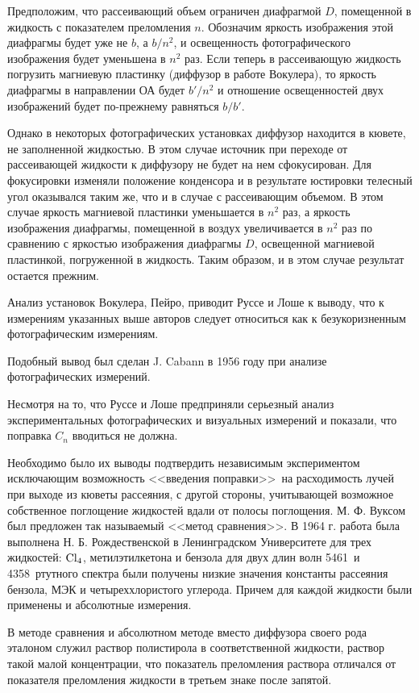 Предположим, что рассеивающий объем ограничен диафрагмой $D$, помещенной в жидкость с показателем преломления $n$. Обозначим яркость изображения этой диафрагмы будет уже не $b$, а $b/n^2$, и освещенность фотографического изображения будет уменьшена в $n^2$ раз. Если теперь в рассеивающую жидкость погрузить магниевую пластинку (диффузор в работе Вокулера), то яркость диафрагмы в направлении ОА будет $b'/n^2$ и отношение освещенностей двух изображений будет по-прежнему равняться $b/b'$.

Однако в некоторых фотографических установках диффузор находится в кювете, не заполненной жидкостью. В этом случае источник при переходе от рассеивающей жидкости к диффузору не будет на нем сфокусирован. Для фокусировки изменяли положение конденсора и в результате юстировки телесный угол оказывался таким же, что  и в случае с рассеивающим объемом. В этом случае яркость магниевой пластинки уменьшается в $n^2$ раз, а яркость изображения диафрагмы, помещенной в воздух увеличивается в $n^2$ раз по сравнению с яркостью изображения диафрагмы $D$, освещенной магниевой пластинкой, погруженной в жидкость. Таким образом, и в этом случае результат остается прежним.

Анализ установок Вокулера, Пейро, приводит Руссе и Лоше к выводу, что к измерениям указанных выше авторов следует относиться как к безукоризненным фотографическим измерениям.

Подобный вывод был сделан J. Cabann в 1956 году при анализе фотографических измерений.

Несмотря на то, что Руссе и Лоше предприняли серьезный анализ экспериментальных фотографических и визуальных измерений и показали, что поправка $C_n$ вводиться не должна.

Необходимо было их выводы подтвердить независимым экспериментом исключающим возможность <<введения поправки>>\ на расходимость лучей при выходе из кюветы рассеяния, с другой стороны, учитывающей возможное собственное поглощение жидкостей вдали от полосы поглощения. М. Ф. Вуксом был предложен так называемый <<метод сравнения>>. В 1964 г. работа была выполнена Н. Б. Рождественской в Ленинградском Университете для трех жидкостей: $\rm Cl_4$, метилэтилкетона и бензола для двух длин волн 5461\angst\ и 4358\angst\ ртутного спектра были получены низкие значения константы рассеяния бензола, МЭК и четыреххлористого углерода.
Причем для каждой жидкости были применены и абсолютные измерения.

В методе сравнения и абсолютном методе вместо диффузора своего рода эталоном служил раствор полистирола в соответственной жидкости, раствор такой малой концентрации, что показатель преломления раствора отличался от показателя преломления жидкости в третьем знаке после запятой.

